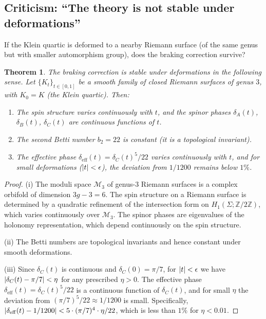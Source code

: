 \documentclass[12pt,a4paper]{article}
\newtheorem{theorem}{Theorem}[section]
\theoremstyle{definition}
\theoremstyle{remark}
\newcommand{\ZZ}{\mathbb{Z}}
\newcommand{\cM}{\mathcal{M}}
\DeclarePairedDelimiter\abs{\lvert}{\rvert}
\begin{document}
\subsection{Criticism: ``The theory is not stable under deformations''}

If the Klein quartic is deformed to a nearby Riemann surface (of the same genus but with smaller automorphism group), does the braking correction survive?

\begin{theorem}
\label{thm:stability}
The braking correction is stable under deformations in the following sense. Let $\{K_t\}_{t \in [0,1]}$ be a smooth family of closed Riemann surfaces of genus $3$, with $K_0 = K$ (the Klein quartic). Then:
\begin{enumerate}[label=(\roman*)]
\item The spin structure varies continuously with $t$, and the spinor phases $\delta_A(t)$, $\delta_B(t)$, $\delta_C(t)$ are continuous functions of $t$.
\item The second Betti number $b_2 = 22$ is constant (it is a topological invariant).
\item The effective phase $\delta_{\mathrm{eff}}(t) = \delta_C(t)^5/22$ varies continuously with $t$, and for small deformations ($\abs{t} < \epsilon$), the deviation from $1/1200$ remains below $1\%$.
\end{enumerate}
\end{theorem}

\begin{proof}
(i) The moduli space $\cM_3$ of genus-$3$ Riemann surfaces is a complex orbifold of dimension $3g - 3 = 6$. The spin structure on a Riemann surface is determined by a quadratic refinement of the intersection form on $H_1(\Sigma; \ZZ/2\ZZ)$, which varies continuously over $\cM_3$. The spinor phases are eigenvalues of the holonomy representation, which depend continuously on the spin structure.

(ii) The Betti numbers are topological invariants and hence constant under smooth deformations.

(iii) Since $\delta_C(t)$ is continuous and $\delta_C(0) = \pi/7$, for $\abs{t} < \epsilon$ we have $\abs{\delta_C(t) - \pi/7} < \eta$ for any prescribed $\eta > 0$. The effective phase $\delta_{\mathrm{eff}}(t) = \delta_C(t)^5/22$ is a continuous function of $\delta_C(t)$, and for small $\eta$ the deviation from $(\pi/7)^5/22 \approx 1/1200$ is small. Specifically, $\abs{\delta_{\mathrm{eff}}(t) - 1/1200} < 5 \cdot (\pi/7)^4 \cdot \eta / 22$, which is less than $1\%$ for $\eta < 0.01$.
\end{proof}
\end{document}
